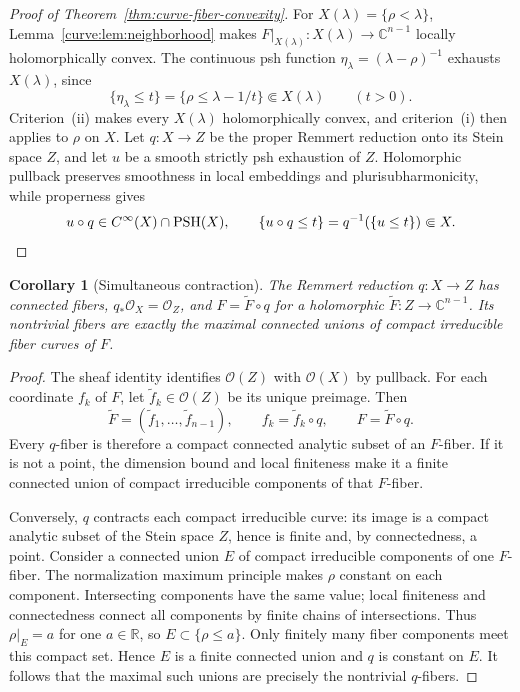 \documentclass[11pt]{amsart}
\newtheorem{corollary}[theorem]{Corollary}
\theoremstyle{definition}
\theoremstyle{remark}
\numberwithin{equation}{section}
\newcommand{\C}{\mathbb C}
\newcommand{\R}{\mathbb R}
\newcommand{\OO}{\mathcal O}
\begin{document}
\begin{proof}[Proof of Theorem~\ref{thm:curve-fiber-convexity}]
For $X(\lambda)=\{\rho<\lambda\}$,
Lemma~\ref{curve:lem:neighborhood} makes
$F|_{X(\lambda)}:X(\lambda)\to\C^{n-1}$ locally holomorphically
convex. The continuous psh function
$\eta_\lambda=(\lambda-\rho)^{-1}$ exhausts $X(\lambda)$, since
\[
 \{\eta_\lambda\le t\}=\{\rho\le\lambda-1/t\}
 \Subset X(\lambda)\qquad(t>0).
\]
Criterion~\textup{(ii)} makes every $X(\lambda)$ holomorphically
convex, and criterion~\textup{(i)} then applies to $\rho$ on $X$.
Let $q:X\to Z$ be the proper Remmert reduction onto its Stein
space $Z$, and let $u$ be a smooth strictly psh exhaustion of $Z$.
Holomorphic pullback preserves smoothness in local embeddings and
plurisubharmonicity, while properness gives
\[
 u\circ q\in C^\infty(X)\cap\operatorname{PSH}(X),\qquad
 \{u\circ q\le t\}=q^{-1}(\{u\le t\})\Subset X.\qedhere
\]
\end{proof}

\begin{corollary}[Simultaneous contraction]\label{cor:curve-contraction}
The Remmert reduction $q:X\to Z$ has connected fibers,
$q_*\OO_X=\OO_Z$, and $F=\widetilde F\circ q$ for a holomorphic
$\widetilde F:Z\to\C^{n-1}$. Its nontrivial fibers are exactly the
maximal connected unions of compact irreducible fiber curves of $F$.
\end{corollary}
\begin{proof}
The sheaf identity identifies $\OO(Z)$ with $\OO(X)$ by pullback.
For each coordinate $f_k$ of $F$, let $\widetilde f_k\in\OO(Z)$
be its unique preimage. Then
\[
 \widetilde F=(\widetilde f_1,\ldots,\widetilde f_{n-1}),\qquad
 f_k=\widetilde f_k\circ q,
 \qquad F=\widetilde F\circ q.
\]
Every $q$-fiber is therefore a compact connected analytic subset of
an $F$-fiber. If it is not a point, the dimension bound and local
finiteness make it a finite connected union of compact irreducible
components of that $F$-fiber.

Conversely, $q$ contracts each compact irreducible curve: its image
is a compact analytic subset of the Stein space $Z$, hence is finite
and, by connectedness, a point. Consider a connected union $E$ of
compact irreducible components of one $F$-fiber. The normalization
maximum principle makes $\rho$ constant on each component.
Intersecting components have the same value; local finiteness and
connectedness connect all components by finite chains of intersections.
Thus $\rho|_E=a$ for one $a\in\R$, so $E\subset\{\rho\le a\}$.
Only finitely many fiber components meet this compact set. Hence
$E$ is a finite connected union and $q$ is constant on $E$.
It follows that the maximal such unions are precisely the nontrivial
$q$-fibers.
\end{proof}
\end{document}
